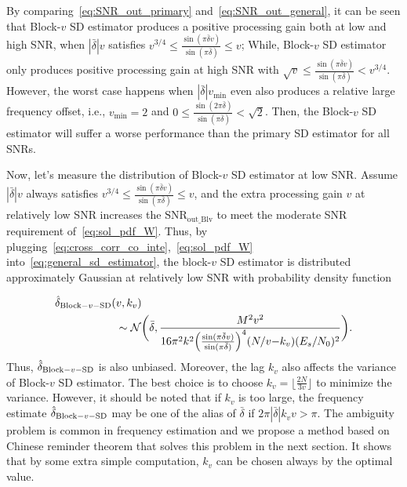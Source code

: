 By comparing~\eqref{eq:SNR_out_primary} and~\eqref{eq:SNR_out_general}, it can be seen that Block-$v$ SD estimator produces a positive processing gain both at low and high SNR, when $|\bar{\delta}|v$ satisfies
$v^{3/4}\leq\frac{\sin(\pi \bar{\delta}v)}{\sin(\pi \bar{\delta})}\leq v$; While, Block-$v$ SD estimator
only produces positive processing gain at high SNR with $\sqrt{v}\leq\frac{\sin(\pi \bar{\delta}v)}{\sin(\pi \bar{\delta})}<v^{3/4}$.
However, the worst case happens when $|\bar{\delta}|v_{\text{min}}$ even also produces a relative large frequency offset, 
i.e., $v_{\text{min}}=2$ and $0\leq\frac{\sin(2\pi \bar{\delta})}{\sin(\pi \bar{\delta})}<\sqrt{2}$. Then, the Block-$v$ SD estimator will suffer a worse performance than the primary SD estimator for all SNRs.

Now, let's measure the distribution of Block-$v$ SD estimator at low SNR.
Assume $|\bar{\delta}|v$ always satisfies $v^{3/4}\leq\frac{\sin(\pi \bar{\delta}v)}{\sin(\pi \bar{\delta})}\leq v$,
and the extra processing gain $v$ at relatively low SNR increases the $\text{SNR}_{\text{out\_Blv}}$ to meet the moderate SNR requirement of~\eqref{eq:sol_pdf_W}.
Thus, by plugging~\eqref{eq:cross_corr_co_inte},~\eqref{eq:sol_pdf_W} into~\eqref{eq:general_sd_estimator}, the block-$v$ SD estimator is distributed approximately Gaussian at relatively low SNR with probability density function

\begin{equation}
  \begin{aligned}
  \label{eq:pdf_general_delta}
      \hat{\delta}_{\text{Block}-v-\text{SD}}(&v,k_v) \\
      &\sim \mathcal{N} \bigg(\bar{\delta},\frac{M^2v^2}{16\pi^2k^2\Big(\frac{\sin(\pi \bar{\delta}v)}{\sin(\pi \bar{\delta})}\Big)^4(N/v{-}k_v)(E_s/N_0)^2}\bigg).
  \end{aligned}
\end{equation} 
Thus, $\hat{\delta}_{\text{Block}-v-\text{SD}}$ is also unbiased. Moreover, the lag $k_v$ also affects the variance of Block-$v$ SD estimator. The best choice is to choose
$k_v=\lfloor\frac{2N}{3v}\rfloor$ to minimize the variance. However,
it should be noted that if $k_v$ is too large, the frequency estimate $\hat{\delta}_{\text{Block}-v-\text{SD}}$ 
may be one of the alias of $\bar{\delta}$ if $2\pi|\bar{\delta}|k_vv>\pi$. The ambiguity problem is 
common in frequency estimation and we propose a method based on Chinese reminder theorem that solves this problem in the next section.
It shows that by some extra simple computation, $k_v$ can be chosen always by the optimal value. 

